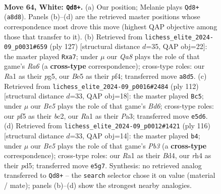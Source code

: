 \documentclass[11pt]{article}
\begin{document}
\clearpage

\begin{figure}[p]\centering
\begin{subfigure}{0.46\textwidth}\centering
\resizebox{\linewidth}{!}{%
\newchessgame
\chessboard[
  setfen={Q7/8/1k6/p2pBp2/P6r/8/8/RN4K1 w - - 8 64},
  showmover=false,
  pgfstyle=straightmove, color=movearrow, markmove={a8-d8}
]}
\caption{}
\end{subfigure}\hfill
\begin{subfigure}{0.46\textwidth}\centering
\resizebox{\linewidth}{!}{%
\newchessgame
\chessboard[
  setfen={7R/P1k5/4p1K1/6P1/5P2/r6p/8/8 b - - 1 64},
  showmover=false,
  pgfstyle=straightmove, color=movearrow, markmove={a3-a7}
]}
\caption{}
\end{subfigure}
\\[4pt]
\begin{subfigure}{0.46\textwidth}\centering
\resizebox{\linewidth}{!}{%
\newchessgame
\chessboard[
  setfen={8/5k2/R2B1p2/3p4/p2P3r/P7/2b5/4K3 w - - 8 57},
  showmover=false,
  pgfstyle=straightmove, color=movearrow, markmove={d6-c5}
]}
\caption{}
\end{subfigure}\hfill
\begin{subfigure}{0.46\textwidth}\centering
\resizebox{\linewidth}{!}{%
\newchessgame
\chessboard[
  setfen={8/5PR1/8/3p1r2/3B3k/1P6/p3K3/8 w - - 4 59},
  showmover=false,
  pgfstyle=straightmove, color=movearrow, markmove={b3-b4}
]}
\caption{}
\end{subfigure}
\caption{\textbf{Move 64, White: \texttt{Qd8+}.} (a) Our position; Melanie plays \texttt{Qd8+} (\texttt{a8d8}). Panels (b)--(d) are the retrieved master positions whose correspondence most drove this move (highest QAP objective among those that transfer to it). (b) Retrieved from \texttt{lichess\_elite\_2024-09\_p0031\#659} (ply 127) [structural distance $d$=35, QAP obj=22]: the master played \texttt{Rxa7}; under $\mu$ our \emph{Qa8} plays the role of that game's \emph{Ra6} (a \textbf{cross-type} correspondence); cross-type roles: our \emph{R}a1 as their \emph{p}g5, our \emph{B}e5 as their \emph{p}f4; transferred move \texttt{a8d5}. (c) Retrieved from \texttt{lichess\_elite\_2024-09\_p0016\#2484} (ply 112) [structural distance $d$=33, QAP obj=18]: the master played \texttt{Bc5}; under $\mu$ our \emph{Be5} plays the role of that game's \emph{Bd6}; cross-type roles: our \emph{p}f5 as their \emph{b}c2, our \emph{R}a1 as their \emph{P}a3; transferred move \texttt{e5d6}. (d) Retrieved from \texttt{lichess\_elite\_2024-09\_p0012\#1421} (ply 116) [structural distance $d$=33, QAP obj=14]: the master played \texttt{b4}; under $\mu$ our \emph{Be5} plays the role of that game's \emph{Pb3} (a \textbf{cross-type} correspondence); cross-type roles: our \emph{R}a1 as their \emph{B}d4, our \emph{r}h4 as their \emph{p}d5; transferred move \texttt{e5g7}. Synthesis: no retrieved analog transferred to \texttt{Qd8+} -- the \texttt{search} selector chose it on value (material / mate); panels (b)--(d) show the strongest nearby analogies.}
\label{fig:thought-m126}
\end{figure}
\end{document}
